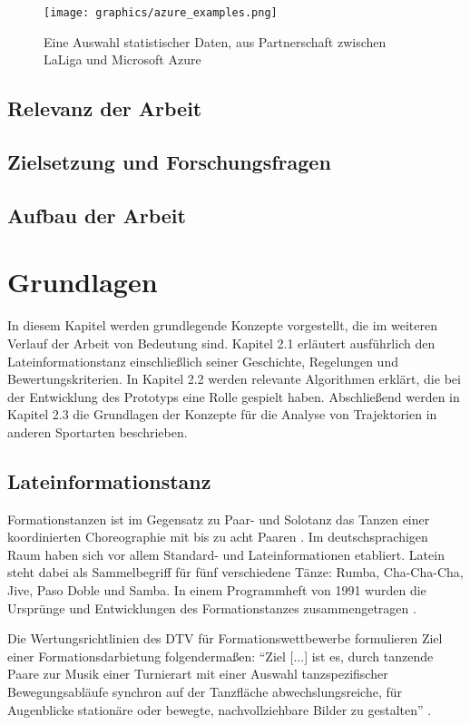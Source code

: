 \documentclass[
  ngerman,
  a4paper,  %
  twoside,  %
  bibliography=totoc,
  headsepline,
  cleardoublepage=empty,
  parskip=half,
  draft=false
]{scrbook}
\begin{document}
\begin{figure}
  \centering
  \texttt{[image: graphics/azure\_examples.png]}
  \caption{Eine Auswahl statistischer Daten, aus Partnerschaft zwischen LaLiga und Microsoft Azure \cite{microsoftazure}}
  \label{azure_examples}
\end{figure}
\section{Relevanz der Arbeit}
\section{Zielsetzung und Forschungsfragen}
\section{Aufbau der Arbeit}

\chapter{Grundlagen}

In diesem Kapitel werden grundlegende Konzepte vorgestellt, die im weiteren Verlauf der Arbeit von Bedeutung sind. Kapitel 2.1 erläutert ausführlich den Lateinformationstanz einschließlich seiner Geschichte, Regelungen und Bewertungskriterien. In Kapitel 2.2 werden relevante Algorithmen erklärt, die bei der Entwicklung des Prototyps eine Rolle gespielt haben. Abschließend werden in Kapitel 2.3 die Grundlagen der Konzepte für die Analyse von Trajektorien in anderen Sportarten beschrieben.

\section{Lateinformationstanz}
Formationstanzen ist im Gegensatz zu Paar- und Solotanz das Tanzen einer koordinierten Choreographie mit bis zu acht Paaren \cite{beck_visual_2023}.
Im deutschsprachigen Raum haben sich vor allem Standard- und Lateinformationen etabliert.
Latein steht dabei als Sammelbegriff für fünf verschiedene Tänze: Rumba, Cha-Cha-Cha, Jive, Paso Doble und Samba. In einem Programmheft von 1991 wurden die Ursprünge und Entwicklungen des Formationstanzes zusammengetragen \cite{formation_geschichte}.


Die Wertungsrichtlinien des DTV für Formationswettbewerbe formulieren Ziel einer Formationsdarbietung folgendermaßen:
\enquote{Ziel [...] ist es, durch tanzende Paare zur Musik einer Turnierart mit einer
  Auswahl tanzspezifischer Bewegungsabläufe synchron auf der Tanzfläche abwechslungsreiche, für
  Augenblicke stationäre oder bewegte, nachvollziehbare Bilder zu gestalten} \cite{wertungsrichtlinien}.
\end{document}
